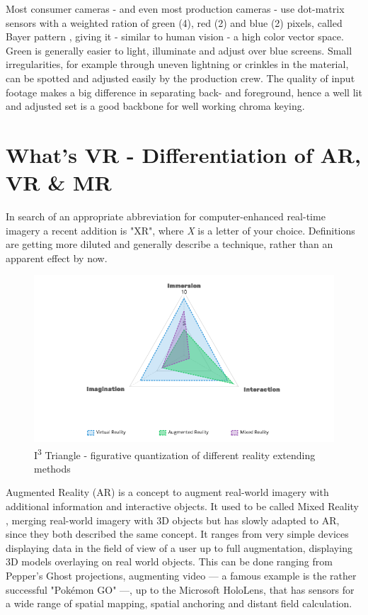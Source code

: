 Most consumer cameras - and even most production cameras - use dot-matrix 
sensors with a weighted ration of green (4), red (2) and blue (2) pixels, 
called Bayer pattern \cite{kodak:bayer:1976}, giving it - similar to human 
vision - a high color vector space. Green is generally easier to light, 
illuminate and adjust over blue screens. Small irregularities, for example 
through uneven lightning or crinkles in the material, can be spotted and 
adjusted easily by the production crew.
\newline
The quality of input footage makes a big difference in separating back- and 
foreground, hence a well lit and adjusted set is a good backbone for well 
working chroma keying.

\section{What's VR - Differentiation of AR, VR \& MR}

In search of an appropriate abbreviation for computer-enhanced real-time 
imagery a recent addition is "XR", where \textit{X} is a letter of your choice. 
Definitions are getting more diluted and generally describe a technique, rather 
than an apparent effect by now.

\begin{figure}[htb]
	\includegraphics[width=\textwidth]{gfx/ext-reality/i3-triangle.png}
	\caption{I\textsuperscript{3} Triangle - figurative quantization of 
		different reality extending methods}
	\label{fig:xr:i3-triangle}
\end{figure}
Augmented Reality (AR) is a concept to augment real-world imagery with 
additional information and interactive objects. It used to be called Mixed 
Reality\cite{satoh:case:1998} \cite{tamura:mixed-reality:2001}, merging 
real-world imagery with 3D objects but has slowly adapted to AR, since they 
both described the same concept. It ranges from very simple devices displaying 
data in the field of view of a user up to full augmentation, displaying 3D 
models overlaying on real world objects. This can be done ranging from Pepper's 
Ghost projections, augmenting video --- a famous example is the rather 
successful "Pokémon GO" ---, up to the Microsoft HoloLens, that has sensors for 
a wide range of spatial mapping, spatial anchoring and distant field 
calculation.

